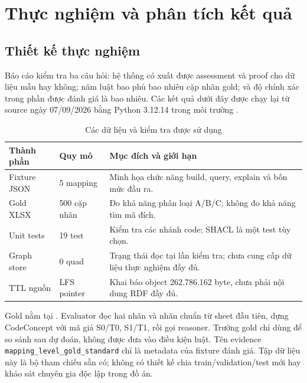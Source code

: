 \chapter{Thực nghiệm và phân tích kết quả}\label{chap:evaluation}

\section{Thiết kế thực nghiệm}
Báo cáo kiểm tra ba câu hỏi: hệ thống có xuất được assessment và proof
cho dữ liệu mẫu hay không; năm luật bao phủ bao nhiêu cặp nhãn gold;
và độ chính xác trong phần được đánh giá là bao nhiêu.
Các kết quả dưới đây được chạy lại từ source ngày 07/09/2026
bằng Python 3.12.14 trong môi trường .

\begin{table}[htbp]
\centering\small
\caption{Các dữ liệu và kiểm tra được sử dụng}\label{tab:data}
\begin{tabularx}{\textwidth}{p{3.3cm}p{2.0cm}Y}
\toprule
Thành phần & Quy mô & Mục đích và giới hạn\\
\midrule
Fixture JSON & 5 mapping & Minh họa chức năng build, query, explain và bốn mức đầu ra.\\
Gold XLSX & 500 cặp nhãn & Đo khả năng phân loại A/B/C; không đo khả năng tìm mã đích.\\
Unit tests & 19 test & Kiểm tra các nhánh code; SHACL là một test tùy chọn.\\
Graph store & 0 quad & Trạng thái đọc tại lần kiểm tra; chưa cung cấp dữ liệu thực nghiệm đầy đủ.\\
TTL nguồn & LFS pointer & Khai báo object 262.786.162 byte, chưa phải nội dung RDF đầy đủ.\\
\bottomrule
\end{tabularx}
\end{table}

Gold nằm tại
.
Evaluator đọc hai nhãn và nhãn chuẩn từ sheet đầu tiên, dựng CodeConcept
với mã giả S0/T0, S1/T1, rồi gọi reasoner.
Trường gold chỉ dùng để so sánh sau dự đoán, không được đưa vào điều kiện luật.
Tên evidence \texttt{mapping\_level\_gold\_standard} chỉ là metadata của
fixture đánh giá. Tập dữ liệu này là bộ tham chiếu sẵn có; không có thiết kế
chia train/validation/test mới hay khảo sát chuyên gia độc lập trong đồ án.

